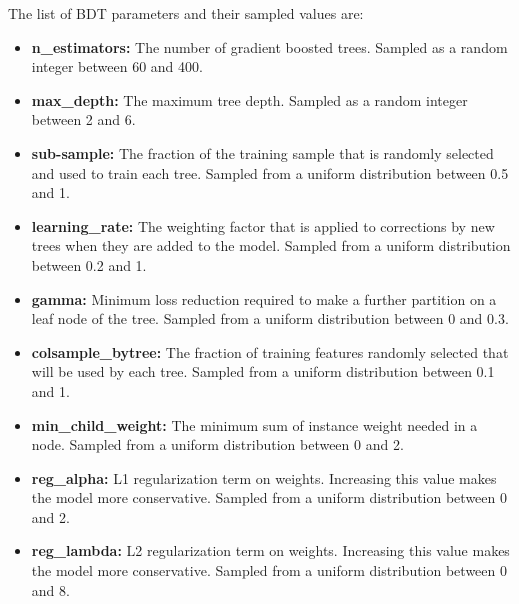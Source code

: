 The list of BDT parameters and their sampled values are:
\begin{itemize}
\item \textbf{n\_estimators:} The number of gradient boosted trees. Sampled as a random integer between 60 and 400.
\item \textbf{max\_depth:} The maximum tree depth. Sampled as a random integer between 2 and 6.
\item \textbf{sub-sample:} The fraction of the training sample that is randomly selected and used to train each tree. Sampled from a uniform distribution between 0.5 and 1.
\item \textbf{learning\_rate:} The weighting factor that is applied to corrections by new trees when they are added to the model. Sampled from a uniform distribution between 0.2 and 1.
\item \textbf{gamma:} Minimum loss reduction required to make a further partition on a leaf node of the tree. Sampled from a uniform distribution between 0 and 0.3.
\item \textbf{colsample\_bytree:} The fraction of training features randomly selected that will be used by each tree. Sampled from a uniform distribution between 0.1 and 1.
\item \textbf{min\_child\_weight:} The minimum sum of instance weight needed in a node. Sampled from a uniform distribution between 0 and 2.
\item \textbf{reg\_alpha:} L1 regularization term on weights. Increasing this value makes the model more conservative. Sampled from a uniform distribution between 0 and 2.
\item \textbf{reg\_lambda:} L2 regularization term on weights. Increasing this value makes the model more conservative. Sampled from a uniform distribution between 0 and 8.
\end{itemize}

